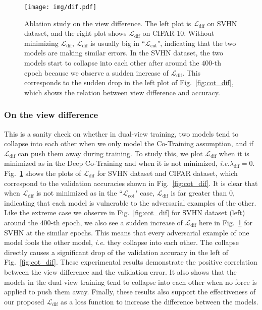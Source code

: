 \documentclass[runningheads]{llncs}
\begin{document}
\begin{figure}[t]
  \texttt{[image: img/dif.pdf]}
  \caption{Ablation study on the view difference.
  The left plot is $\mathcal{L}_{\text{dif}}$ on SVHN dataset, and the right plot shows $\mathcal{L}_{\text{dif}}$ on CIFAR-10.
  Without minimizing $\mathcal{L}_{\text{dif}}$, $\mathcal{L}_{\text{dif}}$ is usually big in ``$\mathcal{L}_{\text{cot}}$", indicating that the two models are making similar errors.
  In the SVHN dataset, the two models start to collapse into each other after around the $400$-th epoch because we observe a sudden increase of $\mathcal{L}_{\text{dif}}$.
  This corresponds to the sudden drop in the left plot of Fig.~\ref{fig:cot_dif}, which shows the relation between view difference and accuracy.
  }
  \label{fig:dif}
\end{figure}\subsubsection{On the view difference}
This is a sanity check on whether in dual-view training, two models tend to collapse into each other when we only model the Co-Training assumption, and if $\mathcal{L}_{\text{dif}}$ can push them away during training.
To study this, we plot $\mathcal{L}_{\text{dif}}$ when it is minimized as in the Deep Co-Training and when it is not minimized, \textit{i.e.}$\lambda_{\text{dif}}=0$.
Fig.~\ref{fig:dif} shows the plots of $\mathcal{L}_{\text{dif}}$ for SVHN dataset and CIFAR dataset, which correspond to the validation accuracies shown in Fig.~\ref{fig:cot_dif}.
It is clear that when $\mathcal{L}_{\text{dif}}$ is not minimized as in the ``$\mathcal{L}_{\text{cot}}$" case,
$\mathcal{L}_{\text{dif}}$ is far greater than $0$, indicating that each model is vulnerable to the adversarial examples of the other.
Like the extreme case we observe in Fig.~\ref{fig:cot_dif} for SVHN dataset (left) around the $400$-th epoch, we also see a sudden increase of $\mathcal{L}_{\text{dif}}$ here in Fig.~\ref{fig:dif} for SVHN at the similar epochs.
This means that every adversarial example of one model fools the other model, \textit{i.e.} they collapse into each other.
The collapse directly causes a significant drop of the validation accuracy in the left of Fig.~\ref{fig:cot_dif}.
These experimental results demonstrate the positive correlation between the view difference and the validation error.
It also shows that the models in the dual-view training tend to collapse into each other when no force is applied to push them away.
Finally, these results also support the effectiveness of our proposed $\mathcal{L}_{\text{dif}}$ as a loss function to increase the difference between the models.
\end{document}

